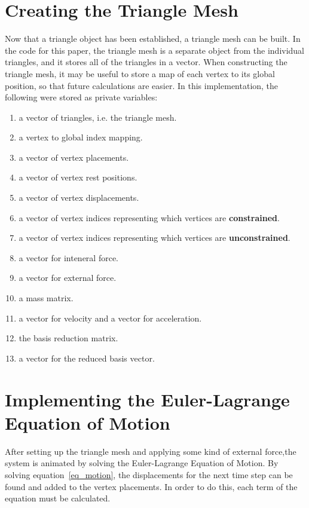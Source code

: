 \documentclass[twocolumn,10pt]{asme2ej}
\begin{document}

\section{Creating the Triangle Mesh}

Now that a triangle object has been established, a triangle mesh can be built. In the code for this paper, the triangle mesh is a separate object from the individual triangles, and it stores all of the triangles in a vector. When constructing the triangle mesh, it may be useful to store a map of each vertex to its global position, so that future calculations are easier. In this implementation, the following were stored as private variables:

\begin{enumerate}
  \item a vector of triangles, i.e. the triangle mesh.
  \item a vertex to global index mapping.
  \item a vector of vertex placements.
  \item a vector of vertex rest positions.
  \item a vector of vertex displacements.
  \item a vector of vertex indices representing which vertices are \textbf{constrained}.
  \item a vector of vertex indices representing which vertices are \textbf{unconstrained}.
  \item a vector for inteneral force.
  \item a vector for external force.
  \item a mass matrix.
  \item a vector for velocity and a vector for acceleration.
  \item the basis reduction matrix.
  \item a vector for the reduced basis vector.
\end{enumerate}

\section{Implementing the Euler-Lagrange Equation of Motion}

After setting up the triangle mesh and applying some kind of external force,the system is animated by solving the Euler-Lagrange Equation of Motion. By solving equation~\ref{eq_motion}, the displacements for the next time step can be found and added to the vertex placements. In order to do this, each term of the equation must be calculated.
\end{document}
